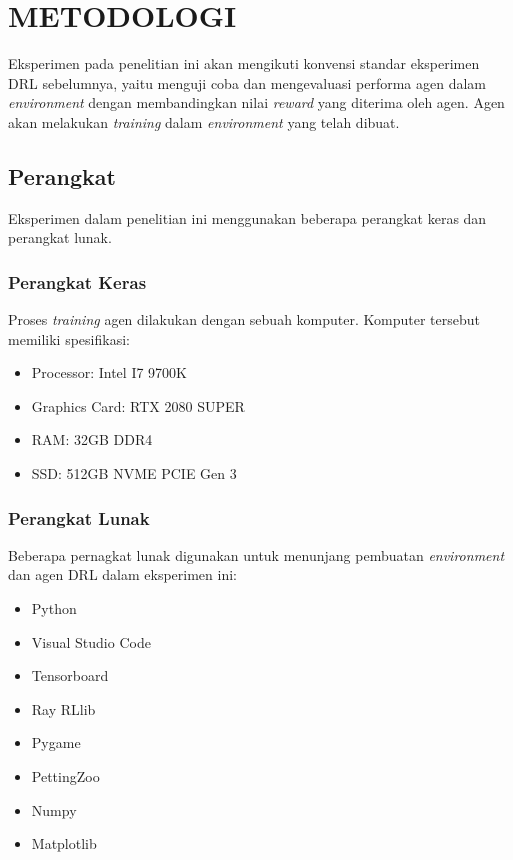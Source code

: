 \chapter{METODOLOGI}
\label{chap:metodologi}


Eksperimen pada penelitian ini akan mengikuti konvensi standar eksperimen DRL sebelumnya, yaitu menguji coba dan mengevaluasi performa agen dalam \emph{environment} dengan membandingkan nilai \emph{reward} yang diterima oleh agen.
Agen akan melakukan \emph{training} dalam \emph{environment} yang telah dibuat.

\section{Perangkat}
\label{sec:perangkat}

Eksperimen dalam penelitian ini menggunakan beberapa perangkat keras dan perangkat lunak.


\subsection{Perangkat Keras}
\label{subsec:perangkatkeras}

Proses \emph{training} agen dilakukan dengan sebuah komputer. Komputer tersebut memiliki spesifikasi:
\begin{itemize}
  \item Processor: Intel I7 9700K
  \item Graphics Card: RTX 2080 SUPER
  \item RAM: 32GB DDR4
  \item SSD: 512GB NVME PCIE Gen 3
\end{itemize}

\subsection{Perangkat Lunak}
\label{subsec:perangkatlunak}

Beberapa pernagkat lunak digunakan untuk menunjang pembuatan \emph{environment} dan agen DRL dalam eksperimen ini:
\begin{itemize}
  \item Python
  \item Visual Studio Code
  \item Tensorboard
  \item Ray RLlib
  \item Pygame
  \item PettingZoo
  \item Numpy
  \item Matplotlib
\end{itemize}
